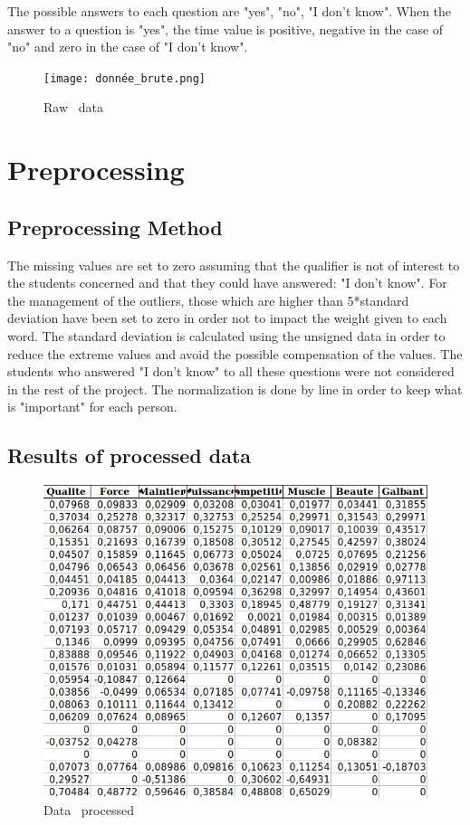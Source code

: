 \documentclass[12pt]{article}
\begin{document}
The possible answers to each question are "yes", "no", "I don't know". When the answer to a question is "yes", the time value is positive, negative in the case of "no" and zero in the case of "I don't know".


\begin{figure}[h]
\begin{center}
\texttt{[image: donnée\_brute.png]} 
\caption[]{ Raw \ data}
\end{center}
\end{figure}


\section{Preprocessing}

\subsection{Preprocessing Method}


The missing values are set to zero assuming that the qualifier is not of interest to the students concerned and that they could have answered: "I don't know".
For the management of the outliers, those which are higher than 5*standard deviation have been set to zero in order not to impact the weight given to each word. The standard deviation is calculated using the unsigned data in order to reduce the extreme values and avoid the possible compensation of the values.
The students who answered "I don't know" to all these questions were not considered in the rest of the project.  
The normalization is done by line in order to keep what is "important" for each person. 

\newpage

\subsection{Results of processed data}

\begin{figure}[h]
\begin{center}
\includegraphics[scale=0.7]{donnée_nettoyé.png} 
\caption[]{Data \ processed }
\end{center}
\end{figure}
\end{document}
